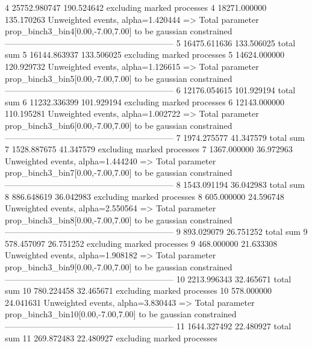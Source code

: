 4          25752.980747    190.524642      excluding marked processes    
4          18271.000000    135.170263      Unweighted events, alpha=1.420444
  => Total parameter prop_binch3_bin4[0.00,-7.00,7.00] to be gaussian constrained
------------------------------------------------------------
5          16475.611636    133.506025      total sum                     
5          16144.863937    133.506025      excluding marked processes    
5          14624.000000    120.929732      Unweighted events, alpha=1.126615
  => Total parameter prop_binch3_bin5[0.00,-7.00,7.00] to be gaussian constrained
------------------------------------------------------------
6          12176.054615    101.929194      total sum                     
6          11232.336399    101.929194      excluding marked processes    
6          12143.000000    110.195281      Unweighted events, alpha=1.002722
  => Total parameter prop_binch3_bin6[0.00,-7.00,7.00] to be gaussian constrained
------------------------------------------------------------
7          1974.275577     41.347579       total sum                     
7          1528.887675     41.347579       excluding marked processes    
7          1367.000000     36.972963       Unweighted events, alpha=1.444240
  => Total parameter prop_binch3_bin7[0.00,-7.00,7.00] to be gaussian constrained
------------------------------------------------------------
8          1543.091194     36.042983       total sum                     
8          886.648619      36.042983       excluding marked processes    
8          605.000000      24.596748       Unweighted events, alpha=2.550564
  => Total parameter prop_binch3_bin8[0.00,-7.00,7.00] to be gaussian constrained
------------------------------------------------------------
9          893.029079      26.751252       total sum                     
9          578.457097      26.751252       excluding marked processes    
9          468.000000      21.633308       Unweighted events, alpha=1.908182
  => Total parameter prop_binch3_bin9[0.00,-7.00,7.00] to be gaussian constrained
------------------------------------------------------------
10         2213.996343     32.465671       total sum                     
10         780.224458      32.465671       excluding marked processes    
10         578.000000      24.041631       Unweighted events, alpha=3.830443
  => Total parameter prop_binch3_bin10[0.00,-7.00,7.00] to be gaussian constrained
------------------------------------------------------------
11         1644.327492     22.480927       total sum                     
11         269.872483      22.480927       excluding marked processes    
